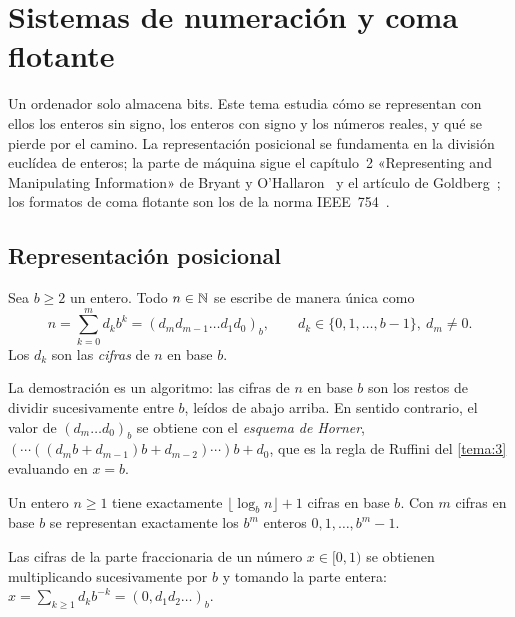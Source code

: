 \chapter{Sistemas de numeración y coma flotante}
\label{tema:6}

Un ordenador solo almacena bits. Este tema estudia cómo se representan con ellos los enteros sin signo, los enteros con signo y los números reales, y qué se pierde por el camino. La representación posicional se fundamenta en la división euclídea de enteros; la parte de máquina sigue el capítulo~2 «Representing and Manipulating Information» de Bryant y O'Hallaron~\cite{csapp} y el artículo de Goldberg~\cite{goldberg}; los formatos de coma flotante son los de la norma IEEE~754~\cite{ieee754}.

\section{Representación posicional}

\begin{teorema}\label{teo:base}
Sea $b\ge2$ un entero. Todo $n\in\mathbb{N}$ se escribe de manera única como
\[
n=\sum_{k=0}^{m}d_kb^k=(d_md_{m-1}\dots d_1d_0)_b,\qquad d_k\in\{0,1,\dots,b-1\},\ d_m\neq0.
\]
Los $d_k$ son las \emph{cifras} de $n$ en base $b$.
\end{teorema}

La demostración es un algoritmo: las cifras de $n$ en base $b$ son los restos de dividir sucesivamente entre $b$, leídos de abajo arriba. En sentido contrario, el valor de $(d_m\dots d_0)_b$ se obtiene con el \emph{esquema de Horner}, $(\cdots((d_mb+d_{m-1})b+d_{m-2})\cdots)b+d_0$, que es la regla de Ruffini del \cref{tema:3} evaluando en $x=b$.

\addtocounter{definicion}{1}%

\begin{proposicion}\label{prop:cifras}
Un entero $n\ge1$ tiene exactamente $\lfloor\log_bn\rfloor+1$ cifras en base $b$. Con $m$ cifras en base $b$ se representan exactamente los $b^m$ enteros $0,1,\dots,b^m-1$.
\end{proposicion}

Las cifras de la parte fraccionaria de un número $x\in[0,1)$ se obtienen multiplicando sucesivamente por $b$ y tomando la parte entera: $x=\sum_{k\ge1}d_kb^{-k}=(0{,}d_1d_2\dots)_b$.

